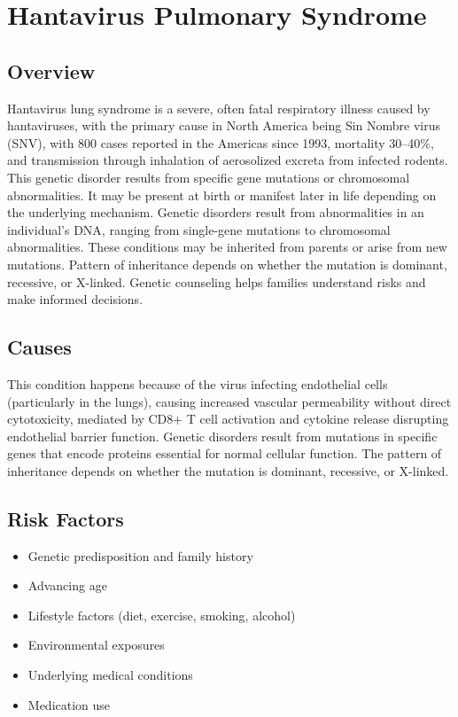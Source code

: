\chapter{Hantavirus Pulmonary Syndrome}
\label{sec:Hantavirus Pulmonary Syndrome}

\section{Overview}
Hantavirus lung syndrome is a severe, often fatal respiratory illness caused by hantaviruses, with the primary cause in North America being Sin Nombre virus (SNV), with 800 cases reported in the Americas since 1993, mortality 30--40\%, and transmission through inhalation of aerosolized excreta from infected rodents. This genetic disorder results from specific gene mutations or chromosomal abnormalities. It may be present at birth or manifest later in life depending on the underlying mechanism. Genetic disorders result from abnormalities in an individual's DNA, ranging from single-gene mutations to chromosomal abnormalities. These conditions may be inherited from parents or arise from new mutations. Pattern of inheritance depends on whether the mutation is dominant, recessive, or X-linked. Genetic counseling helps families understand risks and make informed decisions.
\section{Causes}
This condition happens because of the virus infecting endothelial cells (particularly in the lungs), causing increased vascular permeability without direct cytotoxicity, mediated by CD8+ T cell activation and cytokine release disrupting endothelial barrier function. Genetic disorders result from mutations in specific genes that encode proteins essential for normal cellular function. The pattern of inheritance depends on whether the mutation is dominant, recessive, or X-linked.   
\section{Risk Factors}

\begin{itemize}[noitemsep]
  \item Genetic predisposition and family history
  \item Advancing age
  \item Lifestyle factors (diet, exercise, smoking, alcohol)
  \item Environmental exposures
  \item Underlying medical conditions
  \item Medication use
\end{itemize}
